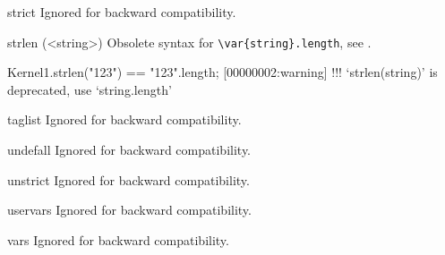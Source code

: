 \begin{urbiscriptapi}
\item[strict]
  Ignored for backward compatibility.


\item[strlen](<string>)%
  Obsolete syntax for \lstinline|\var{string}.length|, see
  .
\begin{urbiassert}
Kernel1.strlen("123") == "123".length;
[00000002:warning] !!! `strlen(string)' is deprecated, use `string.length'
\end{urbiassert}


\item[taglist]
  Ignored for backward compatibility.


\item[undefall]
  Ignored for backward compatibility.


\item[unstrict]
  Ignored for backward compatibility.


\item[uservars]
  Ignored for backward compatibility.


\item[vars]
  Ignored for backward compatibility.
\end{urbiscriptapi}



